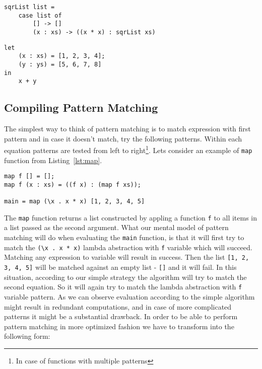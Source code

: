 \documentclass[12pt,a4paper]{report}
\begin{document}
\hspace*{-1.5in}
\begin{lstlisting}[style=haskell,label=lst:case_pattern_matching,caption={Pattern matching in
case expressions.}]
sqrList list =
    case list of
        [] -> []
        (x : xs) -> ((x * x) : sqrList xs)
\end{lstlisting}

\hspace*{-1.5in}
\begin{lstlisting}[style=haskell,label=lst:letrec_pattern_matching,caption={Pattern matching
  in let(rec) expressions.}]
let
    (x : xs) = [1, 2, 3, 4];
    (y : ys) = [5, 6, 7, 8]
in
    x + y
\end{lstlisting}

\subsection{Compiling Pattern Matching}
The simplest way to think of pattern matching is to match expression with first
pattern and in case it doesn't match, try the following patterns. Within each
equation patterns are tested from left to right\footnote{In case of functions
with multiple patterns}. Lets consider an example of \texttt{map} function from
Listing~\ref{lst:map}.

\hspace*{-1.5in}
\begin{lstlisting}[style=haskell,label=lst:map,caption={Map function example.}]
map f [] = [];
map f (x : xs) = ((f x) : (map f xs));

main = map (\x . x * x) [1, 2, 3, 4, 5]
\end{lstlisting}

The \texttt{map} function returns a list constructed by appling a function
\texttt{f} to all items in a list passed as the second argument. What our
mental model of pattern matching will do when evaluating the \texttt{main}
function, is that it will first try to match the \texttt{(\textbackslash x . x
* x)} lambda abstraction with \texttt{f} variable which will succeed. Matching
any expression to variable will result in success. Then the list \texttt{[1, 2,
3, 4, 5]} will be matched against an empty list - \texttt{[]} and it will fail.
In this situation, according to our simple strategy the algorithm will try to
match the second equation. So it will again try to match the lambda abstraction
with \texttt{f} variable pattern. As we can observe evaluation according to the
simple algorithm might result in redundant computations, and in case of more
complicated patterns it might be a substantial drawback. In order to be able to
perform pattern matching in more optimized fashion we have to transform into
the following form:
\end{document}
